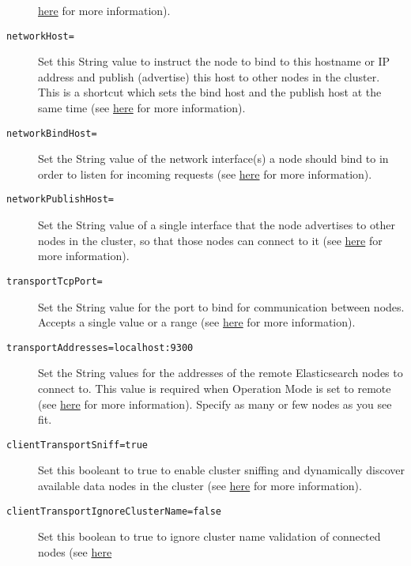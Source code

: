 \begin{description}
\href{https://www.elastic.co/guide/en/elasticsearch/reference/2.2/modules-discovery-zen.html}{here}
for more information).
\item[\texttt{networkHost=}]
Set this String value to instruct the node to bind to this hostname or
IP address and publish (advertise) this host to other nodes in the
cluster. This is a shortcut which sets the bind host and the publish
host at the same time (see
\href{https://www.elastic.co/guide/en/elasticsearch/reference/2.2/modules-network.html\#common-network-settings}{here}
for more information).
\item[\texttt{networkBindHost=}]
Set the String value of the network interface(s) a node should bind to
in order to listen for incoming requests (see
\href{https://www.elastic.co/guide/en/elasticsearch/reference/2.2/modules-network.html\#advanced-network-settings}{here}
for more information).
\item[\texttt{networkPublishHost=}]
Set the String value of a single interface that the node advertises to
other nodes in the cluster, so that those nodes can connect to it (see
\href{https://www.elastic.co/guide/en/elasticsearch/reference/2.2/modules-network.html\#advanced-network-settings}{here}
for more information).
\item[\texttt{transportTcpPort=}]
Set the String value for the port to bind for communication between
nodes. Accepts a single value or a range (see
\href{https://www.elastic.co/guide/en/elasticsearch/reference/2.2/modules-transport.html\#_tcp_transport}{here}
for more information).
\item[\texttt{transportAddresses=localhost:9300}]
Set the String values for the addresses of the remote Elasticsearch
nodes to connect to. This value is required when Operation Mode is set
to remote (see
\href{https://www.elastic.co/guide/en/elasticsearch/client/java-api/2.2/transport-client.html}{here}
for more information). Specify as many or few nodes as you see fit.
\item[\texttt{clientTransportSniff=true}]
Set this booleant to true to enable cluster sniffing and dynamically
discover available data nodes in the cluster (see
\href{https://www.elastic.co/guide/en/elasticsearch/client/java-api/2.2/transport-client.html}{here}
for more information).
\item[\texttt{clientTransportIgnoreClusterName=false}]
Set this boolean to true to ignore cluster name validation of connected
nodes (see
\href{https://www.elastic.co/guide/en/elasticsearch/client/java-api/2.2/transport-client.html}{here}

\end{description}
